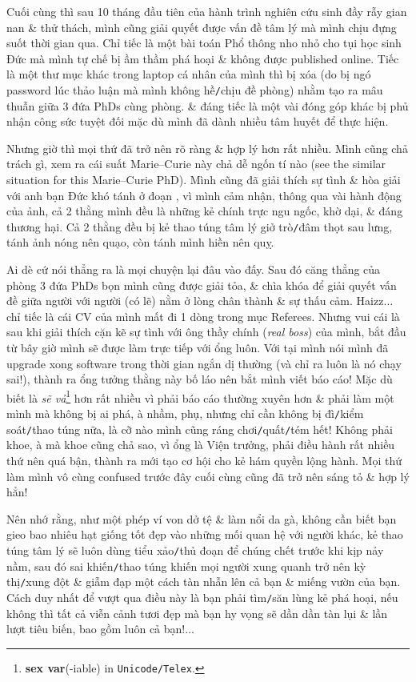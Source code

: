 \documentclass[12pt,twoside]{book}
\begin{document}
Cuối cùng thì sau 10 tháng đầu tiên của hành trình nghiên cứu sinh đầy rẫy gian nan \& thử thách, mình cũng giải quyết được vấn đề tâm lý mà mình chịu đựng suốt thời gian qua. Chỉ tiếc là một bài toán Phổ thông nho nhỏ cho tụi học sinh Đức mà mình tự chế bị ầm thầm phá hoại \& không được published online. Tiếc là một thư mục khác trong laptop cá nhân của mình thì bị xóa (do bị ngó password lúc thảo luận mà mình không hề{\tt/}chịu đề phòng) nhằm tạo ra mâu thuẫn giữa 3 đứa PhDs cùng phòng. \& đáng tiếc là một vài đóng góp khác bị phủ nhận công sức tuyệt đối mặc dù mình đã dành nhiều tâm huyết để thực hiện.

Nhưng giờ thì mọi thứ đã trở nên rõ ràng \& hợp lý hơn rất nhiều. Mình cũng chả trách gì, xem ra cái suất {\sc Marie--Curie} này chả dễ ngốn tí nào (see the similar situation for this {\sc Marie--Curie} PhD). Mình cũng đã giải thích sự tình \& hòa giải với anh bạn Đức khó tánh ở đoạn , vì mình cảm nhận, thông qua vài hành động của ảnh, cả 2 thằng mình đều là những kẻ chính trực ngu ngốc, khờ dại, \& đáng thương hại. Cả 2 thằng đều bị kẻ thao túng tâm lý giở trò{\tt/}đâm thọt sau lưng, tánh ảnh nóng nên quạo, còn tánh mình hiền nên quỵ.

Ai dè cứ nói thẳng ra là mọi chuyện lại đâu vào đấy. Sau đó căng thẳng của phòng 3 đứa PhDs bọn mình cũng được giải tỏa, \& chìa khóa để giải quyết vấn đề giữa người với người (có lẽ) nằm ở lòng chân thành \& sự thấu cảm. Haizz$\ldots$ chỉ tiếc là cái CV của mình mất đi 1 dòng trong mục Referees. Nhưng vui cái là sau khi giải thích cặn kẽ sự tình với ông thầy chính ({\it real boss}) của mình, bắt đầu từ bây giờ mình sẽ được làm trực tiếp với ổng luôn. Với tại mình nói mình đã upgrade xong software trong thời gian ngắn dị thường (và chỉ ra luôn là nó chạy sai!), thành ra ổng tưởng thằng này bố láo nên bắt mình viết báo cáo! Mặc dù biết là {\it sẽ vả}\footnote{{\bf sex var}(-iable) in {\tt Unicode/Telex}.} hơn rất nhiều vì phải báo cáo thường xuyên hơn \& phải làm một mình mà không bị ai phá, à nhầm, phụ, nhưng chỉ cần không bị đì{\tt/}kiểm soát{\tt/}thao túng nữa, là cỡ nào mình cũng ráng chơi{\tt/}quất{\tt/}tém hết! Không phải khoe, à mà khoe cũng chả sao, vì ổng là Viện trưởng, phải điều hành rất nhiều thứ nên quá bận, thành ra mới tạo cơ hội cho kẻ hám quyền lộng hành. Mọi thứ làm mình vô cùng confused trước đây cuối cùng cũng đã trở nên sáng tỏ \& hợp lý hẳn!

Nên nhớ rằng, như một phép ví von dở tệ \& làm nổi da gà, không cần biết bạn gieo bao nhiêu hạt giống tốt đẹp vào những mối quan hệ với người khác, kẻ thao túng tâm lý sẽ luôn dùng tiểu xảo{\tt/}thủ đoạn để chúng chết trước khi kịp nảy nầm, sau đó sai khiến{\tt/}thao túng khiến mọi người xung quanh trở nên kỳ thị{\tt/}xung đột \& giẫm đạp một cách tàn nhẫn lên cả bạn \& miếng vườn của bạn. Cách duy nhất để vượt qua điều này là bạn phải tìm{\tt/}săn lùng kẻ phá hoại, nếu không thì tất cả viễn cảnh tươi đẹp mà bạn hy vọng sẽ dần dần tàn lụi \& lần lượt tiêu biến, bao gồm luôn cả bạn!$\ldots$
\end{document}
